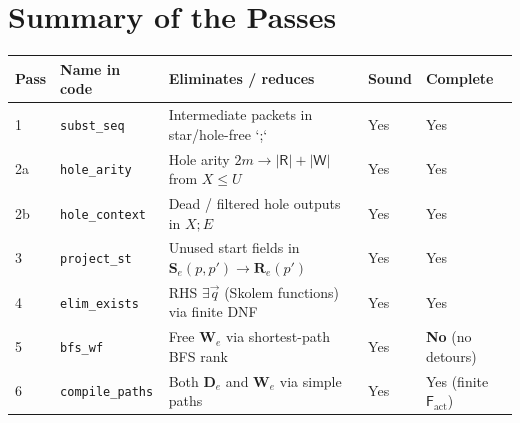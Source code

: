 \documentclass[11pt,a4paper]{article}
\theoremstyle{definition}
\theoremstyle{remark}
\begin{document}
\section{Summary of the Passes}

\begin{center}
\begin{tabular}{@{}lllll@{}}
\toprule
Pass & Name in code & Eliminates / reduces & Sound & Complete \\
\midrule
1 & \texttt{subst\_seq}     & Intermediate packets in star/hole-free `;` & Yes & Yes \\
2a & \texttt{hole\_arity}   & Hole arity $2m \to |\mathsf{R}|+|\mathsf{W}|$ from $X \le U$ & Yes & Yes \\
2b & \texttt{hole\_context} & Dead / filtered hole outputs in $X ; E$ & Yes & Yes \\
3 & \texttt{project\_st}    & Unused start fields in $\mathbf{S}_e(p,p') \to \mathbf{R}_e(p')$ & Yes & Yes \\
4 & \texttt{elim\_exists}   & RHS $\exists \vec{q}$ (Skolem functions) via finite DNF & Yes & Yes \\
5 & \texttt{bfs\_wf}        & Free $\mathbf{W}_e$ via shortest-path BFS rank & Yes & \textbf{No} (no detours) \\
6 & \texttt{compile\_paths} & Both $\mathbf{D}_e$ and $\mathbf{W}_e$ via simple paths & Yes & Yes (finite $\mathsf{F}_{\mathrm{act}}$) \\
\bottomrule
\end{tabular}
\end{center}
\end{document}
